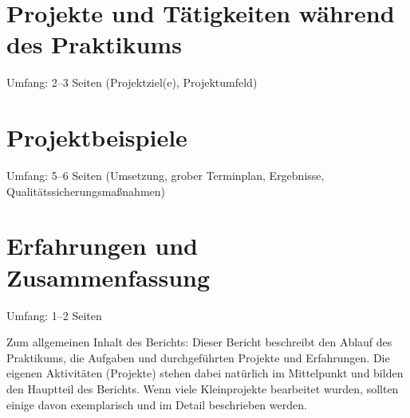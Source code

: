 \documentclass[internship,german,smartquotes]{hgbthesis}
\begin{document}
\chapter{Projekte und Tätigkeiten während des Praktikums}
Umfang: 2--3 Seiten (Projektziel(e), Projektumfeld)
      
\chapter{Projektbeispiele}
Umfang: 5--6 Seiten (Umsetzung, grober Terminplan, Ergebnisse, Qualitätssicherungsmaßnahmen)
   
   
\chapter{Erfahrungen und Zusammenfassung}
Umfang: 1--2 Seiten

Zum allgemeinen Inhalt des Berichts: Dieser Bericht beschreibt den Ablauf des Praktikums, die Aufgaben und durchgeführten Projekte und Erfahrungen. Die eigenen Aktivitäten (Projekte) stehen dabei natürlich im Mittelpunkt und bilden den Hauptteil des Berichts. Wenn viele Kleinprojekte bearbeitet wurden, sollten einige davon exemplarisch und im Detail beschrieben werden.


%
\end{document}
